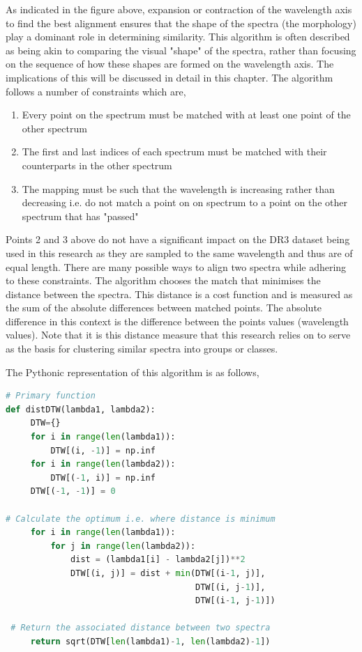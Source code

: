 As indicated in the figure above, expansion or contraction of the wavelength axis to find the best alignment ensures that the shape of the spectra (the morphology) play a dominant role in determining similarity. This algorithm is often described as being akin to comparing the visual "shape" of the spectra, rather than focusing on the sequence of how these shapes are formed on the wavelength axis. The implications of this will be discussed in detail in this chapter. The algorithm follows a number of constraints which are,

\begin{enumerate}
    \item Every point on the spectrum must be matched with at least one point of the other spectrum
    \item The first and last indices of each spectrum must be matched with their counterparts in the other spectrum
    \item The mapping must be such that the wavelength is increasing rather than decreasing i.e. do not match a point on on spectrum to a point on the other spectrum that has "passed"
\end{enumerate}

Points 2 and 3 above do not have a significant impact on the DR3 dataset being used in this research as they are sampled to the same wavelength and thus are of equal length. There are many possible ways to align two spectra while adhering to these constraints. The algorithm chooses the match that minimises the distance between the spectra. This distance is a cost function and is measured as the sum of the absolute differences between matched points. The absolute difference in this context is the difference between the points values (wavelength values). Note that it is this distance measure that this research relies on to serve as the basis for clustering similar spectra into groups or classes.

The Pythonic representation of this algorithm is as follows,

\begin{lstlisting}[language=Python]
# Primary function
def distDTW(lambda1, lambda2):
     DTW={}
     for i in range(len(lambda1)):
         DTW[(i, -1)] = np.inf
     for i in range(len(lambda2)):
         DTW[(-1, i)] = np.inf
     DTW[(-1, -1)] = 0
 
# Calculate the optimum i.e. where distance is minimum
     for i in range(len(lambda1)):
         for j in range(len(lambda2)):
             dist = (lambda1[i] - lambda2[j])**2
             DTW[(i, j)] = dist + min(DTW[(i-1, j)],
                                      DTW[(i, j-1)], 
                                      DTW[(i-1, j-1)])
 
 # Return the associated distance between two spectra
     return sqrt(DTW[len(lambda1)-1, len(lambda2)-1])
\end{lstlisting}

